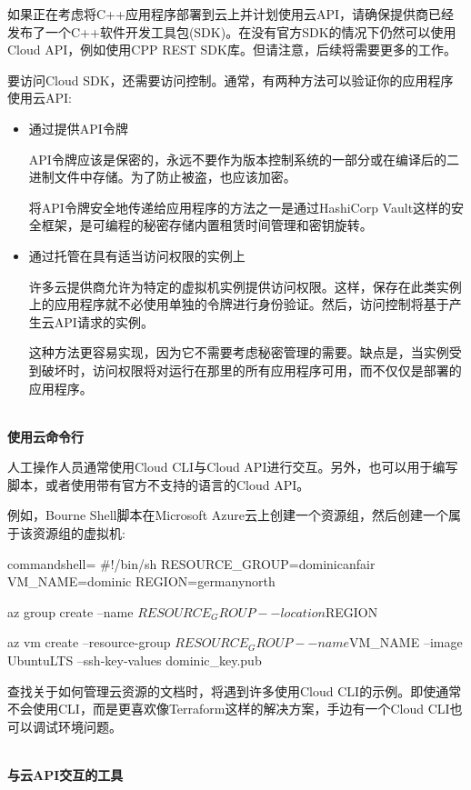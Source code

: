 如果正在考虑将C++应用程序部署到云上并计划使用云API，请确保提供商已经发布了一个C++软件开发工具包(SDK)。在没有官方SDK的情况下仍然可以使用Cloud API，例如使用CPP REST SDK库。但请注意，后续将需要更多的工作。 

要访问Cloud SDK，还需要访问控制。通常，有两种方法可以验证你的应用程序使用云API:

\begin{itemize}
\item 
通过提供API令牌

API令牌应该是保密的，永远不要作为版本控制系统的一部分或在编译后的二进制文件中存储。为了防止被盗，也应该加密。

将API令牌安全地传递给应用程序的方法之一是通过HashiCorp Vault这样的安全框架，是可编程的秘密存储内置租赁时间管理和密钥旋转。

\item 
通过托管在具有适当访问权限的实例上

许多云提供商允许为特定的虚拟机实例提供访问权限。这样，保存在此类实例上的应用程序就不必使用单独的令牌进行身份验证。然后，访问控制将基于产生云API请求的实例。

这种方法更容易实现，因为它不需要考虑秘密管理的需要。缺点是，当实例受到破坏时，访问权限将对运行在那里的所有应用程序可用，而不仅仅是部署的应用程序。
\end{itemize}

\hspace*{\fill} \\ %
\noindent
\textbf{使用云命令行}

人工操作人员通常使用Cloud CLI与Cloud API进行交互。另外，也可以用于编写脚本，或者使用带有官方不支持的语言的Cloud API。

例如，Bourne Shell脚本在Microsoft Azure云上创建一个资源组，然后创建一个属于该资源组的虚拟机:

\begin{tcblisting}{commandshell={}}
#!/bin/sh
RESOURCE_GROUP=dominicanfair
VM_NAME=dominic
REGION=germanynorth

az group create --name $RESOURCE_GROUP --location $REGION

az vm create --resource-group $RESOURCE_GROUP --name $VM_NAME --image
UbuntuLTS --ssh-key-values dominic_key.pub
\end{tcblisting}

查找关于如何管理云资源的文档时，将遇到许多使用Cloud CLI的示例。即使通常不会使用CLI，而是更喜欢像Terraform这样的解决方案，手边有一个Cloud CLI也可以调试环境问题。

\hspace*{\fill} \\ %
\noindent
\textbf{与云API交互的工具}

